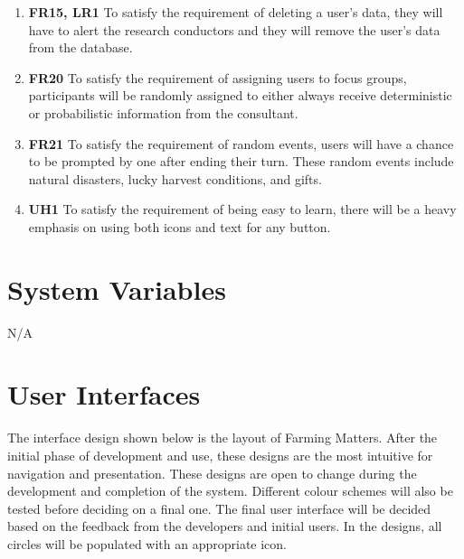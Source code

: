 \documentclass[12pt, titlepage]{article}
\begin{document}
\begin{enumerate}
    \item \textbf{FR15, LR1} To satisfy the requirement of deleting a user's data, they will have to alert the research conductors and they will remove the user's data from the database.\\
    \item \textbf{FR20} To satisfy the requirement of assigning users to focus groups, participants will be randomly assigned to either always receive deterministic or probabilistic information from the consultant.\\
    \item \textbf{FR21} To satisfy the requirement of random events, users will have a chance to be prompted by one after ending their turn. These random events include natural disasters, lucky harvest conditions, and gifts.\\
    \item \textbf{UH1} To satisfy the requirement of being easy to learn, there will be a heavy emphasis on using both icons and text for any button.\\
\end{enumerate}

\section{System Variables}
N/A

\section{User Interfaces}
The interface design shown below is the layout of Farming Matters. After the initial phase of development and use, these designs are the most intuitive for navigation and presentation. These designs are open to change during the development and completion of the system. Different colour schemes will also be tested before deciding on a final one. The final user interface will be decided based on the feedback from the developers and initial users. In the designs, all circles will be populated with an appropriate icon.

\end{document}

